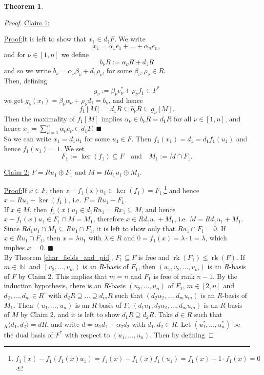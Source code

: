 \documentclass[12pt,a4paper]{report}
\theoremstyle{definition}
\newtheorem{theorem}{Theorem}[chapter] %
\theoremstyle{num.custom-title}
\newenvironment{claim}[1]{\par\noindent\underline{Claim#1:}\space}{} %
\newenvironment{claimproof}[1]{\par\noindent\underline{Proof:}\space#1}{\leavevmode\unskip\penalty9999 \hbox{}\nobreak\hfill\quad\hbox{$\blacksquare$}} %
\DeclareMathOperator{\rk}{rk}
\DeclareMathOperator{\N}{\mathbb{N}}
\DeclareMathOperator{\sse}{\subseteq}
\begin{document}
\begin{theorem}
\begin{proof}
\begin{claim}{ 1}
\begin{claimproof}
It is left to show that $x_1 \in d_1 F$. We write
\[
x_1 = \alpha_1 e_1 + \ldots + \alpha_n e_n,
\]
and for $\nu \in [1,n]$ we define
\[
b_\nu R := \alpha_\nu R + d_1 R
\]
and so we write $b_\nu = \alpha_\nu \beta_\nu + d_1 \rho_\nu$, for some $\beta_\nu, \rho_\nu \in R$.\\
Then, defining
\[
g_\nu := \beta_\nu e_\nu^* + \rho_\nu f_1 \in F^*
\] 
we get $g_\nu(x_1) = \beta_\nu \alpha_\nu + \rho_\nu d_1 = b_\nu$, and hence 
\[
f_1[M] = d_1 R \sse b_\nu R \sse g_\nu[M].
\]
Then the maximality of $f_1[M]$ implies $\alpha_\nu \in b_\nu R = d_1 R$ for all $\nu \in [1,n]$, and hence $x_1 = \sum_{\nu=1}^n \alpha_\nu e_\nu \in d_1 F$.
\end{claimproof}
\end{claim}
\\[6pt]
So we can write $x_1 = d_1 u_1$ for some $u_1 \in F$. Then $f_1(x_1)=d_1=d_1 f_1(u_1)$ and hence $f_1(u_1)=1$. We set
\[
F_1 := \ker(f_1) \sse F \quad \text{and} \quad M_1 := M \cap F_1.
\]
\begin{claim}{ 2}
$F = R u_1 \oplus F_1$ and $M = R d_1 u_1 \oplus M_1$.
\begin{claimproof}
If $x \in F$, then $x-f_1(x) u_1 \in \ker(f_1) = F_1$,\footnote{$f_1(x)-f_1(f_1(x)u_1) = f_1(x)-f_1(x)f_1(u_1) = f_1(x)-1 \cdot f_1(x) = 0$.} and hence $x = R u_1 + \ker(f_1)$, i.e. $F = R u_1 +F_1$.\\
If $x \in M$, then $f_1(x)u_1 \in d_1 R u_1 = Rx_1 \sse M$, and hence $x - f_1(x) u_1 \in F_1 \cap M = M_1$, therefore $x \in R d_1 u_1 + M_1$, i.e. $M = R d_1 u_1 + M_1$.\\
Since $R d_1 u_1 \cap M_1 \sse R u_1 \cap F_1$, it is left to show only that $R u_1 \cap F_1 = 0$. If $x \in R u_1 \cap F_1$, then $x = \lambda u_1$ with $\lambda \in R$ and $0 = f_1(x) = \lambda \cdot 1 = \lambda$, which implies $x=0$.
\end{claimproof}
\end{claim}
\\[6pt]
By Theorem \ref{char_fields_and_pid}, $F_1 \sse F$ is free and $\rk(F_1) \leq \rk(F)$. If $m \in \N$ and $(v_2,...,v_m)$ is an $R$-basis of $F_1$, then $(u_1,v_2,...,v_m)$ is an $R$-basis of $F$ by Claim 2. This implies that $m=n$ and $F_1$ is free of rank $n-1$. By the induction hypothesis, there is an $R$-basis $(u_2,...,u_n)$ of $F_1$, $m \in [2,n]$ and $d_2,...,d_m \in R^\circ$ with $d_2 R \supseteq \ldots \supseteq d_m R$ such that $(d_2 u_2,...,d_m u_m)$ is an $R$-basis of $M_1$. Then $(u_1,...,u_n)$ is an $R$-basis of $F$, $(d_1 u_1, d_2 u_2, ..., d_m u_m)$ is an $R$-basis of $M$ by Claim 2, and it is left to show $d_1 R \supseteq d_2 R$. Take $d \in R$ such that ${}_R \langle d_1,d_2 \rangle = dR$, and write $d = \alpha_1 d_1 + \alpha_2 d_2$ with $d_1,d_2 \in R$. Let $(u_1^*,...,u_n^*)$ be the dual basis of $F^*$ with respect to $(u_1,...,u_n)$. Then by defining

\end{proof}
\end{theorem}
\end{document}
